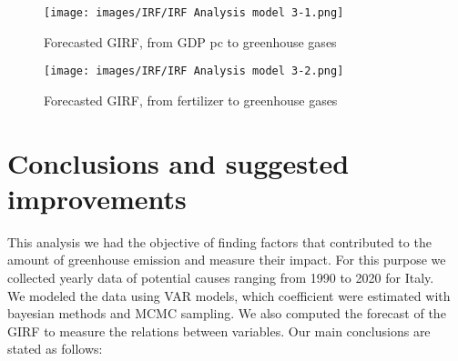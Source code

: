 \documentclass[12pt]{article}
\begin{document}
 \begin{figure}[H]
    \centering
    \texttt{[image: images/IRF/IRF Analysis model 3-1.png]}
    \caption{Forecasted GIRF, from GDP pc to greenhouse gases}
    \label{fig:IRF3_1}
\end{figure}

 \begin{figure}[H]
    \centering
    \texttt{[image: images/IRF/IRF Analysis model 3-2.png]}
    \caption{Forecasted GIRF, from fertilizer to greenhouse gases}
    \label{fig:IRF3_2}
\end{figure}


\clearpage

\section{Conclusions and suggested improvements} \label{Conclusions}
This analysis we had the objective of finding factors that contributed to the amount of greenhouse emission and measure their impact. For this purpose we collected yearly data of potential causes ranging from 1990 to 2020 for Italy.\\

We modeled the data using VAR models, which coefficient were estimated with bayesian methods and MCMC sampling. We also computed the forecast of the GIRF to measure the relations between variables. Our main conclusions are stated as follows:\\
\end{document}
